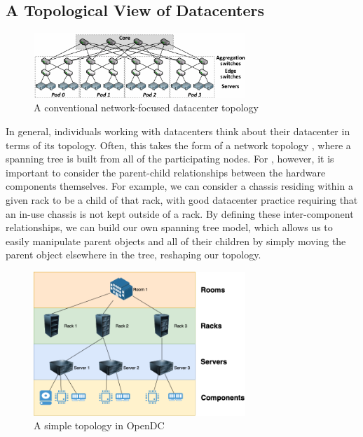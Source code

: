 \documentclass[11pt]{article}
\begin{document}
	\subsection{A Topological View of Datacenters}
		\begin{figure}[ht!]
			\centering
			\includegraphics[width=8cm]{couto2012/Fat-tree-with-4-port-switches-n-4.png}
			\caption[A conventional network-focussed datacenter topology]{A conventional network-focused datacenter topology \cite{Couto2012}}
			\label{fig:networktopology}
		\end{figure}
		In general, individuals working with datacenters think about their datacenter in terms of its topology. 
		Often, this takes the form of a network topology \cite{Couto2012}, where a spanning tree is built from all of the participating nodes. 
		For \opendc{}, however, it is important to consider the parent-child relationships between the hardware components themselves. 
		For example, we can consider a chassis residing within a given rack to be a child of that rack, with good datacenter practice requiring that an in-use chassis is not kept outside of a rack.
		By defining these inter-component relationships, we can build our own spanning tree model, which allows us to easily manipulate parent objects and all of their children by simply moving the parent object elsewhere in the tree, reshaping our topology.
		\begin{figure}[ht!]
			\centering
			\includegraphics[width=8cm]{opendc-topology.png}
			\caption[A simple topology in OpenDC]{A simple topology in OpenDC}
			\label{fig:example-opendc-topology}
		\end{figure}
\end{document}
